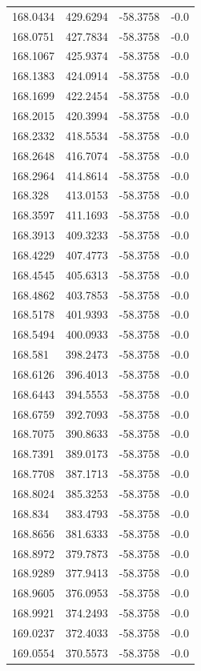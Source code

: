 \begin{table}[H]
\begin{tabular}{llll}
168.0434 & 429.6294 & -58.3758 & -0.0 \\
168.0751 & 427.7834 & -58.3758 & -0.0 \\
168.1067 & 425.9374 & -58.3758 & -0.0 \\
168.1383 & 424.0914 & -58.3758 & -0.0 \\
168.1699 & 422.2454 & -58.3758 & -0.0 \\
168.2015 & 420.3994 & -58.3758 & -0.0 \\
168.2332 & 418.5534 & -58.3758 & -0.0 \\
168.2648 & 416.7074 & -58.3758 & -0.0 \\
168.2964 & 414.8614 & -58.3758 & -0.0 \\
168.328 & 413.0153 & -58.3758 & -0.0 \\
168.3597 & 411.1693 & -58.3758 & -0.0 \\
168.3913 & 409.3233 & -58.3758 & -0.0 \\
168.4229 & 407.4773 & -58.3758 & -0.0 \\
168.4545 & 405.6313 & -58.3758 & -0.0 \\
168.4862 & 403.7853 & -58.3758 & -0.0 \\
168.5178 & 401.9393 & -58.3758 & -0.0 \\
168.5494 & 400.0933 & -58.3758 & -0.0 \\
168.581 & 398.2473 & -58.3758 & -0.0 \\
168.6126 & 396.4013 & -58.3758 & -0.0 \\
168.6443 & 394.5553 & -58.3758 & -0.0 \\
168.6759 & 392.7093 & -58.3758 & -0.0 \\
168.7075 & 390.8633 & -58.3758 & -0.0 \\
168.7391 & 389.0173 & -58.3758 & -0.0 \\
168.7708 & 387.1713 & -58.3758 & -0.0 \\
168.8024 & 385.3253 & -58.3758 & -0.0 \\
168.834 & 383.4793 & -58.3758 & -0.0 \\
168.8656 & 381.6333 & -58.3758 & -0.0 \\
168.8972 & 379.7873 & -58.3758 & -0.0 \\
168.9289 & 377.9413 & -58.3758 & -0.0 \\
168.9605 & 376.0953 & -58.3758 & -0.0 \\
168.9921 & 374.2493 & -58.3758 & -0.0 \\
169.0237 & 372.4033 & -58.3758 & -0.0 \\
169.0554 & 370.5573 & -58.3758 & -0.0 \\

\end{tabular}
\end{table}
